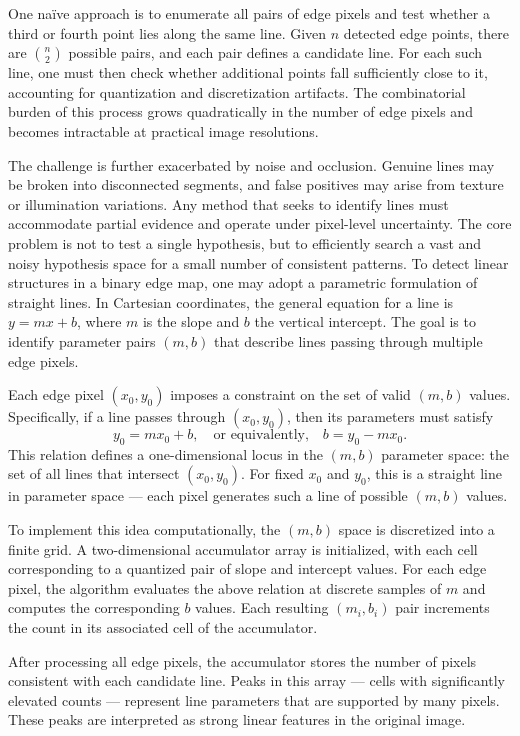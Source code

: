 One naïve approach is to enumerate all pairs of edge pixels and test whether a third or fourth point lies along the same line. Given $n$ detected edge points, there are $\binom{n}{2}$ possible pairs, and each pair defines a candidate line. For each such line, one must then check whether additional points fall sufficiently close to it, accounting for quantization and discretization artifacts. The combinatorial burden of this process grows quadratically in the number of edge pixels and becomes intractable at practical image resolutions.

The challenge is further exacerbated by noise and occlusion. Genuine lines may be broken into disconnected segments, and false positives may arise from texture or illumination variations. Any method that seeks to identify lines must accommodate partial evidence and operate under pixel-level uncertainty. The core problem is not to test a single hypothesis, but to efficiently search a vast and noisy hypothesis space for a small number of consistent patterns.
To detect linear structures in a binary edge map, one may adopt a parametric formulation of straight lines. In Cartesian coordinates, the general equation for a line is $y = mx + b$, where $m$ is the slope and $b$ the vertical intercept. The goal is to identify parameter pairs $(m, b)$ that describe lines passing through multiple edge pixels.

Each edge pixel $(x_0, y_0)$ imposes a constraint on the set of valid $(m, b)$ values. Specifically, if a line passes through $(x_0, y_0)$, then its parameters must satisfy
\[
y_0 = m x_0 + b,
\quad \text{or equivalently,} \quad
b = y_0 - m x_0.
\]
This relation defines a one-dimensional locus in the $(m, b)$ parameter space: the set of all lines that intersect $(x_0, y_0)$. For fixed $x_0$ and $y_0$, this is a straight line in parameter space — each pixel generates such a line of possible $(m, b)$ values.

To implement this idea computationally, the $(m, b)$ space is discretized into a finite grid. A two-dimensional accumulator array is initialized, with each cell corresponding to a quantized pair of slope and intercept values. For each edge pixel, the algorithm evaluates the above relation at discrete samples of $m$ and computes the corresponding $b$ values. Each resulting $(m_i, b_i)$ pair increments the count in its associated cell of the accumulator.

After processing all edge pixels, the accumulator stores the number of pixels consistent with each candidate line. Peaks in this array — cells with significantly elevated counts — represent line parameters that are supported by many pixels. These peaks are interpreted as strong linear features in the original image.

